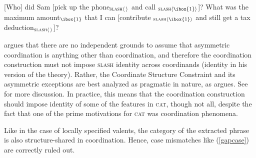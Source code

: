 



\eal
\label{assym}
\ex {}[Who] did Sam [pick up the phone$_{\textup{\textsc{slash}} \langle \, \rangle}$ and call \trace$_{\textup{\textsc{slash}} \langle \ibox{1} \rangle}$]?
\ex What was the maximum amount$_{\ibox{1}}$ that
I can [contribute \trace$_{\textup{\textsc{slash}} \langle \ibox{1} \rangle}$ and still get a tax deduction$_{\textup{\textsc{slash}} \langle \, \rangle}$]?
\zl


\citet{chavesextr} argues that there are no independent grounds to assume that asymmetric coordination is anything other than coordination, and therefore the coordination construction must not impose \textsc{slash} identity across coordinands (\gap identity in his version of the theory). Rather, the Coordinate Structure Constraint and its asymmetric exceptions are best analyzed as
pragmatic in nature, as \citet[Chapter~5]{kehler} argues. 
See  for more discussion.
In practice, this means that the coordination construction should impose identity of some of the features in \textsc{cat}, though not all, despite the fact that one of the prime motivations for \textsc{cat} was
coordination phenomena.

Like in the case of locally specified valents, the category of the extracted phrase is also structure-shared
in coordination. Hence, case mismatches like (\ref{gapcase}) are
correctly ruled out.


